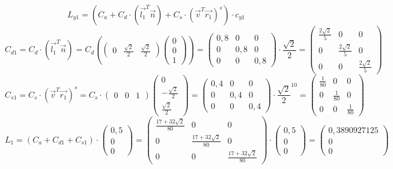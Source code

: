 \documentclass{article}
\begin{document}
\[
L_{y1} = (C_a + C_d\cdot(\overrightarrow{l_1}^T\overrightarrow{n})+C_s\cdot(\overrightarrow{v}^T\overrightarrow{r_1})^s)\cdot c_{y1}
\]
\[
C_{d1}=C_d\cdot(\overrightarrow{l_1}^T\overrightarrow{n})=
C_d
(\begin{pmatrix}
0& \frac{\sqrt{2}}{2}& \frac{\sqrt{2}}{2}
\end{pmatrix}
\begin{pmatrix}
0\\0\\1
\end{pmatrix})=
\begin{pmatrix}
0,8 & 0 & 0\\
0 & 0,8 & 0\\
0 & 0 & 0,8
\end{pmatrix}\cdot \frac{\sqrt{2}}{2}=
\begin{pmatrix}
\frac{2\sqrt{2}}{5} & 0 & 0\\
0 & \frac{2\sqrt{2}}{5} & 0\\
0 & 0 & \frac{2\sqrt{2}}{5}
\end{pmatrix}
\]
\[
C_{s1}=C_s\cdot(\overrightarrow{v}^T\overrightarrow{r_1})^s= C_s\cdot
\begin{pmatrix}
0&0&1
\end{pmatrix}
\begin{pmatrix}
0\\ -\frac{\sqrt{2}}{2}\\ \frac{\sqrt{2}}{2}
\end{pmatrix}=
\begin{pmatrix}
0,4 & 0 & 0\\
0 & 0,4 & 0\\
0 & 0 & 0,4
\end{pmatrix}\cdot \frac{\sqrt{2}}{2}^{10}=
\begin{pmatrix}
\frac{1}{80} & 0 & 0\\
0 & \frac{1}{80} & 0\\
0 & 0 & \frac{1}{80}
\end{pmatrix}
\]
\[
L_1=(
C_a+C_{d1}+C_{s1})\cdot
\begin{pmatrix}
0,5\\0\\0
\end{pmatrix}=
\begin{pmatrix}
\frac{17+32\sqrt{2}}{80} & 0 & 0\\
0 &\frac{17+32\sqrt{2}}{80} & 0\\
0 & 0 & \frac{17+32\sqrt{2}}{80}
\end{pmatrix}\cdot
\begin{pmatrix}
0,5\\0\\0
\end{pmatrix}=
\begin{pmatrix}
0,3890927125\\0\\0
\end{pmatrix}
\]
\end{document}
